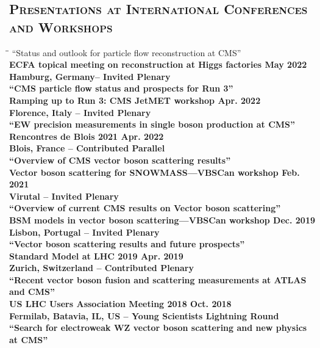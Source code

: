 \documentclass[10pt]{res} %
\begin{document}
\begin{resume}
\section{\textsc{Presentations at International Conferences and Workshops}}
\vspace{-0.1in}
\begin{tabbing}
\hspace{2.3in}\= \hspace{2.6in}\= \kill %
``Status and outlook for particle flow reconstruction at CMS'' \\
\bf{ECFA topical meeting on reconstruction at Higgs factories} 		 \> \>	    May 2022 \\
Hamburg, Germany-- Invited Plenary\\
``CMS particle flow status and prospects for Run 3'' \\
\bf{Ramping up to Run 3: CMS JetMET workshop} 		 \> \>	    Apr. 2022 \\
Florence, Italy -- Invited Plenary\\
``EW precision measurements in single boson production at CMS'' \\
\bf{Rencontres de Blois 2021} 		 \> \>	    Apr. 2022 \\
Blois, France -- Contributed Parallel\\
``Overview of CMS vector boson scattering results'' \\
\bf{Vector boson scattering for SNOWMASS---VBSCan workshop} 		 \> \>	    Feb. 2021 \\
Virutal -- Invited Plenary\\
``Overview of current CMS results on Vector boson scattering'' \\
\bf{BSM models in vector boson scattering---VBSCan workshop} 		 \> \>	    Dec. 2019 \\
Lisbon, Portugal -- Invited Plenary\\
``Vector boson scattering results and future prospects'' \\
\bf{Standard Model at LHC 2019} 		 \> \>	    Apr. 2019 \\
Zurich, Switzerland -- Contributed Plenary \\
``Recent vector boson fusion and scattering measurements at ATLAS and CMS'' \\
\bf{US LHC Users Association Meeting 2018} 		 \> \>	    Oct. 2018 \\
Fermilab, Batavia, IL, US -- Young Scientists Lightning Round \\
``Search for electroweak WZ vector boson scattering and new physics at CMS'' \\

\end{tabbing}
\end{resume}
\end{document}
